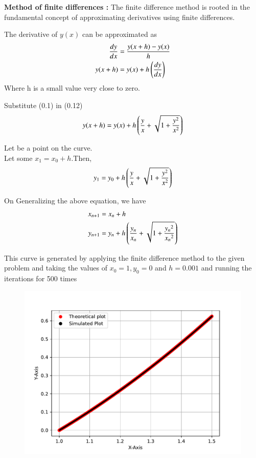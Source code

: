 \documentclass[journal]{IEEEtran}
\begin{document}
\textbf{Method of finite differences :}
The finite difference method is rooted in the fundamental concept of approximating derivatives using finite differences.

The derivative of $y(x)$ can be approximated as 
\begin{align}
    \frac{dy}{dx}&=\frac{y(x+h)-y(x)}{h}\\
    y(x+h)&=y(x)+h\left(\frac{dy}{dx}\right)
\end{align}
Where h is a small value very close to zero.

Substitute (0.1) in (0.12)
\begin{align}
    y(x+h)=y(x)+h \left(\frac{y}{x}+ \sqrt{1 + \frac{y^2}{x^2}}\right)
\end{align}

Let  be a point on the curve.\\
Let some $x_1=x_0 +h$.Then,
\begin{align}
    y_1 = y_0+h \left(\frac{y}{x}+ \sqrt{1 + \frac{y^2}{x^2}}\right)
\end{align}

On Generalizing the above equation, we have 
\begin{align}
    x_{n+1}&=x_{n} +h \\
    y_{n+1}&= y_{n}+h \left(\frac{y_n}{x_n}+ \sqrt{1 + \frac{{y_n}^2}{{x_n}^2}}\right)  
\end{align}

\newpage 
This curve is generated by applying the finite difference method to the given problem and taking the values of $x_0=1,y_0=0$ and $h=0.001$ and running the iterations for 500 times 
\begin{figure}[h]
   \centering
   \includegraphics[width=\columnwidth]{figs/fig.pdf}
\end{figure}
\end{document}
